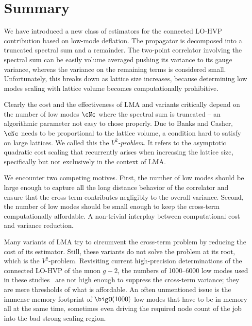 \section{Summary}
\label{sec:lma:summary}

We have introduced a new class of estimators for the connected LO-HVP contribution based on low-mode deflation.
The propagator is decomposed into a truncated spectral sum and a remainder.
The two-point correlator involving the spectral sum can be easily volume averaged pushing its variance to its gauge variance, whereas the variance on the remaining terms is considered small.
Unfortunately, this breaks down as lattice size increases, because determining low modes scaling with lattice volume becomes computationally prohibitive.

Clearly the cost and the effectiveness of LMA and variants critically depend on the number of low modes $\cNc$ where the spectral sum is truncated -- an algorithmic parameter not easy to chose properly.
Due to Banks and Casher\cite{banks1980}, $\cNc$ needs to be proportional to the lattice volume, a condition hard to satisfy on large lattices.
We called this the \emph{$V^{2}$-problem}.
It refers to the asymptotic quadratic cost scaling that recurrently arises when increasing the lattice size, specifically but not exclusively in the context of LMA.

We encounter two competing motives.
First, the number of low modes should be large enough to capture all the long distance behavior of the correlator and ensure that the cross-term contributes negligibly to the overall variance.
Second, the number of low modes should be small enough to keep the cross-term computationally affordable.
A non-trivial interplay between computational cost and variance reduction.

Many variants of LMA try to circumvent the cross-term problem by reducing the cost of its estimator.
Still, these variants do not solve the problem at its root, which is the $V^2$-problem.
Revisiting current high-precision determinations of the connected LO-HVP of the muon $g-2$, the numbers of \numrange{1000}{6000} low modes used in these studies~\cite{Djukanovic:2024cmq,RBC_2024,bmw_2024,Aubin:2022hgm} are not high enough to suppress the cross-term variance; they are mere thresholds of what is affordable.
An often unmentioned issue is the immense memory footprint of $\bigO(1000)$ low modes that have to be in memory all at the same time, sometimes even driving the required node count of the job into the bad strong scaling region.

